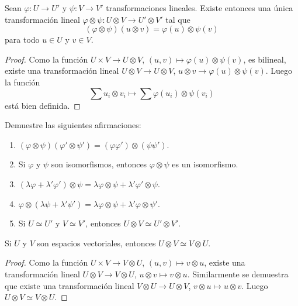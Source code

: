 \begin{lemma}
	Sean $\varphi\colon U\to U'$ y $\psi\colon V\to V'$ transformaciones
	lineales. Existe entonces una única transformación lineal
	$\varphi\otimes\psi\colon U\otimes V\to U'\otimes V'$ tal que
	\[
		(\varphi\otimes\psi)(u\otimes v)=\varphi(u)\otimes\psi(v)
	\]
	para todo $u\in U$ y $v\in V$.
\end{lemma}

\begin{proof}
	Como la función $U\times V\to U\otimes V$,
	$(u,v)\mapsto\varphi(u)\otimes\psi(v)$, es bilineal, existe una
	transformación lineal $U\otimes V\to U\otimes V$, $u\otimes
	v\to\varphi(u)\otimes\psi(v)$. Luego la función
	\[
		\sum u_i\otimes v_i\mapsto\sum\varphi(u_i)\otimes\psi(v_i)
	\]
	está bien definida. 
\end{proof}

\begin{exercise}
	Demuestre las siguientes afirmaciones:
	\begin{enumerate}
		\item $(\varphi\otimes\psi)(\varphi'\otimes\psi')=(\varphi\varphi')\otimes(\psi\psi')$.
		\item Si $\varphi$ y $\psi$ son isomorfismos, entonces
			$\varphi\otimes\psi$ es un isomorfismo. 
		\item $(\lambda\varphi+\lambda'\varphi')\otimes\psi=\lambda\varphi\otimes\psi+\lambda'\varphi'\otimes\psi$.
		\item $\varphi\otimes(\lambda\psi+\lambda'\psi')=\lambda\varphi\otimes\psi+\lambda'\varphi\otimes\psi'$.
		\item Si $U\simeq U'$ y $V\simeq V'$, entonces $U\otimes V\simeq U'\otimes V'$.
	\end{enumerate}
\end{exercise}

\begin{lemma}
	Si $U$ y $V$ son espacios vectoriales, entonces 
	$U\otimes V\simeq V\otimes U$.
\end{lemma}

\begin{proof}
	Como la función $U\times V\to V\otimes U$, $(u,v)\mapsto v\otimes u$,
	existe una transformación lineal $U\otimes V\to V\otimes U$, $u\otimes
	v\mapsto v\otimes u$. Similarmente se demuestra que existe una
	transformación lineal $V\otimes U\to U\otimes V$, $v\otimes u\mapsto
	u\otimes v$. Luego $U\otimes V\simeq V\otimes U$.
\end{proof}

